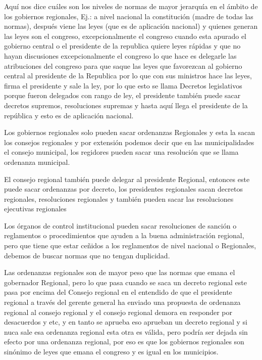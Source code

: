 \documentclass[
  jou,
  floatsintext,
  longtable,
  a4paper,
  nolmodern,
  notxfonts,
  notimes,
  12pt,
  colorlinks=true,linkcolor=blue,citecolor=blue,urlcolor=blue]{apa7}
\begin{document}
Aquí nos dice cuáles son los niveles de normas de mayor jerarquía en el
ámbito de los gobiernos regionales, Ej.: a nivel nacional la
constitución (madre de todas las normas), después viene las leyes (que
es de aplicación nacional) y quienes generan las leyes son el congreso,
excepcionalmente el congreso cuando esta apurado el gobierno central o
el presidente de la republica quiere leyes rápidas y que no hayan
discusiones excepcionalmente el congreso lo que hace es delegarle las
atribuciones del congreso para que saque las leyes que favorezcan al
gobierno central al presidente de la Republica por lo que con sus
ministros hace las leyes, firma el presidente y sale la ley, por lo que
esto se llama Decretos legislativos porque fueron delegados con rango de
ley, el presidente también puede sacar decretos supremos, resoluciones
supremas y hasta aquí llega el presidente de la república y esto es de
aplicación nacional.

Los gobiernos regionales solo pueden sacar ordenanzas Regionales y esta
la sacan los consejos regionales y por extensión podemos decir que en
las municipalidades el consejo municipal, los regidores pueden sacar una
resolución que se llama ordenanza municipal.

El consejo regional también puede delegar al presidente Regional,
entonces este puede sacar ordenanzas por decreto, los presidentes
regionales sacan decretos regionales, resoluciones regionales y también
pueden sacar las resoluciones ejecutivas regionales

Los órganos de control institucional pueden sacar resoluciones de
sanción o reglamentos o procedimientos que ayuden a la buena
administración regional, pero que tiene que estar ceñidos a los
reglamentos de nivel nacional o Regionales, debemos de buscar normas que
no tengan duplicidad.

Las ordenanzas regionales son de mayor peso que las normas que emana el
gobernador Regional, pero lo que pasa cuando se saca un decreto regional
este pasa por encima del Consejo regional en el entendido de que el
presidente regional a través del gerente general ha enviado una
propuesta de ordenanza regional al consejo regional y el consejo
regional demora en responder por desacuerdos y etc, y en tanto se
aprueba eso aprueban un decreto regional y si nuca sale esa ordenanza
regional esta otra es válida, pero podría ser dejada sin efecto por una
ordenanza regional, por eso es que los gobiernos regionales son sinónimo
de leyes que emana el congreso y es igual en los municipios.
\end{document}
